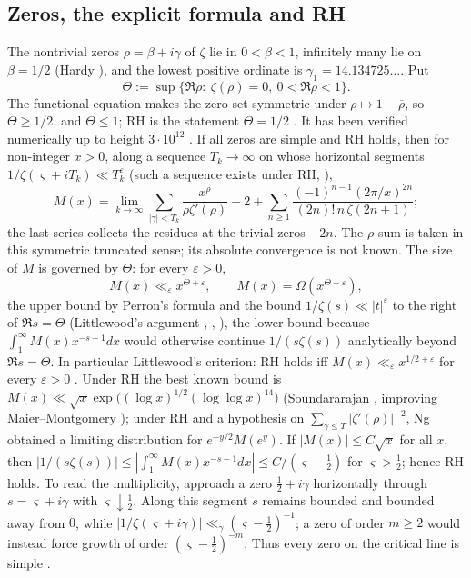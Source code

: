 \documentclass[11pt,reqno]{amsart}
\numberwithin{equation}{section}
\theoremstyle{plain}
\theoremstyle{definition}
\theoremstyle{remark}
\newcommand{\eps}{\varepsilon}
\begin{document}
\subsection{Zeros, the explicit formula and RH}
The nontrivial zeros $\rho=\beta+i\gamma$ of $\zeta$ lie in $0<\beta<1$,
infinitely many lie on $\beta=1/2$ (Hardy \cite{Hardy1914}), and the lowest
positive ordinate is $\gamma_1=14.134725\ldots$. Put
\begin{equation}
\Theta:=\sup\{\Re\rho:\ \zeta(\rho)=0,\ 0<\Re\rho<1\}.
\end{equation}
The functional equation makes the zero set symmetric under
$\rho\mapsto1-\overline\rho$, so $\Theta\ge1/2$, and $\Theta\le1$; RH is the
statement $\Theta=1/2$ \cite{Riemann1859}. It
has been verified numerically up to height $3\cdot10^{12}$
\cite{PlattTrudgian2021}. If all zeros are simple and RH holds, then for non-integer $x>0$,
along a sequence $T_k\to\infty$ on whose horizontal segments
$1/\zeta(\varsigma+iT_k)\ll T_k^{\eps}$ (such a sequence exists under RH,
\cite[\S14.16]{Titchmarsh1986}), \cite[\S14.27]{Titchmarsh1986}
\begin{equation}
M(x)=\lim_{k\to\infty}\sum_{|\gamma|<T_k}\frac{x^\rho}{\rho\zeta'(\rho)}-2+
\sum_{n\ge1}\frac{(-1)^{n-1}(2\pi/x)^{2n}}{(2n)!\,n\,\zeta(2n+1)} ;
\end{equation}
the last series collects the residues at the trivial zeros $-2n$. The
$\rho$-sum is taken in this symmetric truncated sense; its absolute
convergence is not known.
The size of $M$ is governed by $\Theta$: for every $\eps>0$,
\begin{equation}
M(x)\ll_\eps x^{\Theta+\eps},\qquad M(x)=\Omega(x^{\Theta-\eps}),
\end{equation}
the upper bound by Perron's formula and the bound $1/\zeta(s)\ll|t|^{\eps}$
to the right of $\Re s=\Theta$ (Littlewood's argument
\cite{Littlewood1912}, \cite[\S14.25]{Titchmarsh1986}, \cite[\S4]{Pintz2026}),
the lower bound because $\int_1^\infty M(x)x^{-s-1}dx$ would otherwise
continue $1/(s\zeta(s))$ analytically beyond $\Re s=\Theta$. In particular
Littlewood's criterion: RH holds iff $M(x)\ll_\eps x^{1/2+\eps}$ for every
$\eps>0$ \cite{Littlewood1912}. Under RH the best known bound is
$M(x)\ll\sqrt x\exp\bigl((\log x)^{1/2}(\log\log x)^{14}\bigr)$
(Soundararajan \cite{Soundararajan2009}, improving Maier--Montgomery
\cite{MaierMontgomery2009}); under RH and a hypothesis on
$\sum_{\gamma\le T}|\zeta'(\rho)|^{-2}$, Ng \cite{Ng2004} obtained a limiting
distribution for $e^{-y/2}M(e^y)$. If $|M(x)|\le C\sqrt x$ for all $x$, then
$|1/(s\zeta(s))|\le|\int_1^\infty M(x)x^{-s-1}dx|\le C/(\varsigma-\frac12)$
for $\varsigma>\frac12$; hence RH holds.  To read the multiplicity, approach a
zero $\frac12+i\gamma$ horizontally through $s=\varsigma+i\gamma$ with
$\varsigma\downarrow\frac12$.  Along this segment $s$ remains bounded and
bounded away from $0$, while
$|1/\zeta(\varsigma+i\gamma)|\ll_\gamma(\varsigma-\frac12)^{-1}$; a zero of order
$m\ge2$ would instead force growth of order
$(\varsigma-\frac12)^{-m}$.  Thus every zero on the critical line is simple
\cite[\S14.29]{Titchmarsh1986}.
\end{document}
